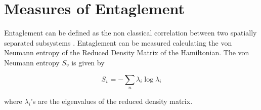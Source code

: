 \section{Measures of Entaglement}
Entaglement can be defined as the non classical correlation between two spatially separated subsystems \cite{jnbbig}. Entaglement can be measured calculating the von Neumann entropy of the Reduced Density Matrix of the Hamiltonian. The von Neumann entropy $S_v$ is given by

\begin{equation}
S_v=-\sum_{n}\lambda_i\log\lambda_i
\end{equation}

where $\lambda_i$'s are the eigenvalues of the reduced density matrix.